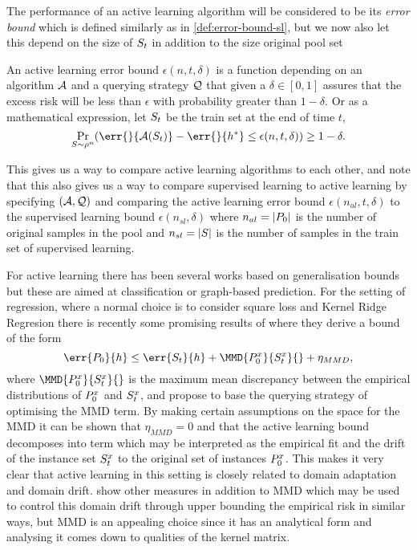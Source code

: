 The performance of an active learning algorithm will be considered to be its
\emph{error bound} which is defined similarly as in \ref{def:error-bound-sl},
but we now also let this depend on the size of \(S_{t}\) in addition to
the size original pool set
\begin{definition}
  \label{def:error-bound-al} An active learning error bound \(\epsilon(n, t,
\delta)\) is a function depending on an algorithm \(\mathcal{A}\) and a querying
strategy \(\mathcal{Q}\) that given a \(\delta \in [0, 1]\) assures that the
excess risk will be less than \(\epsilon\) with probability greater than \(1 -
\delta\). Or as a mathematical expression, let \(S_{t}\) be the train
set at the end of time \(t\),
  \begin{equation*}
  \label{eq:error-bound-al} \Pr_{S \sim \rho^n}(\err{}{\algo(S_{t})} -
\err{}{h^{\ast}} \leq \epsilon(n, t, \delta)) \geq 1 - \delta.
  \end{equation*}
\end{definition} This gives us a way to compare active learning algorithms to
each other, and note that this also gives us a way to compare supervised
learning to active learning by specifying \((\mathcal{A}, \mathcal{Q})\) and comparing
the active learning error bound \(\epsilon(n_{al}, t, \delta)\) to the
supervised learning bound \(\epsilon(n_{sl}, \delta)\) where \(n_{al} =
|P_{0}|\) is the number of original samples in the pool and \(n_{sl} =
|S|\) is the number of samples in the train set of supervised learning.

For active learning there has been several works based on generalisation bounds
\citep{ganti12_upal,xu19_towar_effic_evaluat_risk_via_herdin,gu12_towar} but
these are aimed at classification or graph-based prediction. For the setting of
regression, where a normal choice is to consider square loss and Kernel Ridge
Regresion there is recently some promising results of
\citep{viering17_nuclear_discr_activ_learn} where they derive a bound of the form
\begin{equation}
\label{eq:viering-mmd-gen-bound} \err{\poolset_{0}}{h} \leq
\err{\trainset_{t}}{h} + \MMD{\poolsetx_{0}}{\trainsetx_{t}}{} + \eta_{MMD},
\end{equation}
where \(\MMD{\poolsetx_{0}}{\trainsetx_{t}}{}\) is the maximum mean discrepancy
between the empirical distributions of \(P^x_{0}\) and \(S^x_{t}\),
and propose to base the querying strategy of optimising the MMD term. By making
certain assumptions on the space for the MMD it can be shown that \(\eta_{MMD} =
0\) and that the active learning bound decomposes into term which may be
interpreted as the empirical fit and the drift of the instance set
\(S^x_{t}\) to the original set of instances \(P^x_{0}\). This
makes it very clear that active learning in this setting is closely related to
domain adaptation and domain drift. \citep{cortes19_adapt_based_gener_discr} show
other measures in addition to MMD which may be used to control this domain drift
through upper bounding the empirical risk in similar ways, but MMD is an
appealing choice since it has an analytical form and analysing it comes down to
qualities of the kernel matrix.

